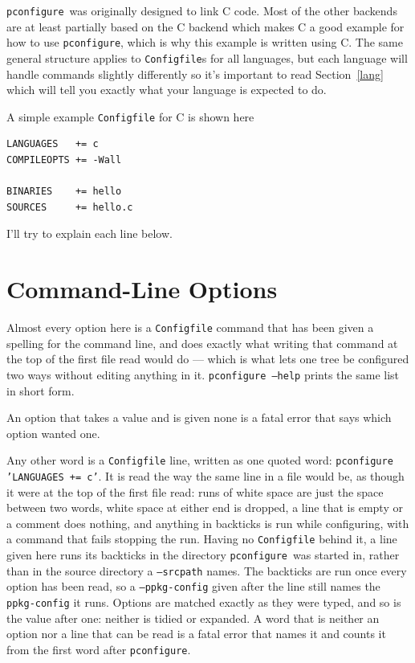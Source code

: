 \documentclass{article}
\newcommand{\pconfigure}{\texttt{pconfigure}}
\begin{document}
\pconfigure\ was originally designed to link C code.  Most of the
other backends are at least partially based on the C backend which
makes C a good example for how to use \pconfigure, which is why this
example is written using C.  The same general structure applies to
\texttt{Configfile}s for all languages, but each language will handle
commands slightly differently so it's important to read
Section~\ref{lang} which will tell you exactly what your language is
expected to do.

A simple example \texttt{Configfile} for C is shown here
\begin{verbatim}
LANGUAGES   += c
COMPILEOPTS += -Wall

BINARIES    += hello
SOURCES     += hello.c
\end{verbatim}
I'll try to explain each line below.

\section{Command-Line Options \label{cl}}

Almost every option here is a \texttt{Configfile} command that has
been given a spelling for the command line, and does exactly what
writing that command at the top of the first file read would do ---
which is what lets one tree be configured two ways without editing
anything in it.  \texttt{pconfigure --help} prints the same list in
short form.

An option that takes a value and is given none is a fatal error that
says which option wanted one.

Any other word is a \texttt{Configfile} line, written as one quoted
word: \texttt{pconfigure 'LANGUAGES += c'}.  It is read the way the
same line in a file would be, as though it were at the top of the
first file read: runs of white space are just the space between two
words, white space at either end is dropped, a line that is empty or a
comment does nothing, and anything in backticks is run while
configuring, with a command that fails stopping the run.  Having no
\texttt{Configfile} behind it, a line given here runs its backticks in
the directory \pconfigure\ was started in, rather than in the source
directory a \texttt{--srcpath} names.  The
backticks are run once every option has been read, so a
\texttt{--ppkg-config} given after the line still names the
\texttt{ppkg-config} it runs.  Options are matched exactly as they
were typed, and so is the value after one: neither is tidied or
expanded.  A word that is neither an option nor a line that can be
read is a fatal error that names it and counts it from the first word
after \texttt{pconfigure}.
\end{document}

